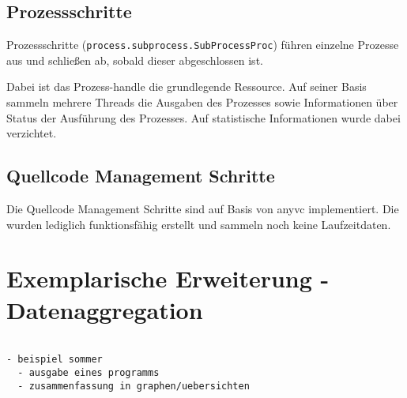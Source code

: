 \subsection{Prozessschritte}

Prozessschritte (\verb|process.subprocess.SubProcessProc|)
führen einzelne Prozesse aus und schließen ab, sobald dieser
abgeschlossen ist.

Dabei ist das Prozess-handle die grundlegende Ressource.
Auf seiner Basis sammeln mehrere Threads die Ausgaben des Prozesses sowie Informationen über Status der Ausführung des Prozesses.
Auf statistische Informationen wurde dabei verzichtet.

\subsection{Quellcode Management Schritte}

Die Quellcode Management Schritte sind auf Basis von anyvc \cite{anyvc:website} implementiert. Die wurden lediglich funktionsfähig erstellt und sammeln noch keine Laufzeitdaten.

\section{Exemplarische Erweiterung - Datenaggregation}

 
\begin{verbatim}

- beispiel sommer
  - ausgabe eines programms
  - zusammenfassung in graphen/uebersichten

\end{verbatim}

